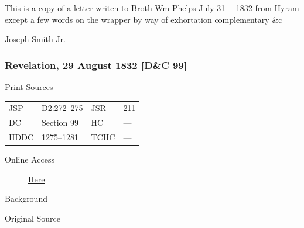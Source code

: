 				This is a copy of a letter writen to Broth Wm Phelps July 31--- 1832 from Hyram except a few words on the wrapper by way of exhortation complementary \&c

				\begin{tightright}
					Joseph Smith Jr.
				\end{tightright}
				
		\subsubsection{Revelation, 29 August 1832 [D\&C 99]}
			\label{EMS-1832-JS-29-AUG-1832}
		
			\begin{description}
				\item[Print Sources]
			\end{description}

				\begin{tabular}{p{0.5in}p{1in}p{0.5in}p{1in}}
				JSP	 	& D2:272--275	& JSR 		& 211 \\
				DC	 	& Section 99 	& HC 		& --- \\
				HDDC 	& 1275--1281	& TCHC 		& --- \\
				\end{tabular}
			
			\begin{description}
				\item[Online Access] \href{https://www.josephsmithpapers.org/paper-summary/revelation-29-august-1832-dc-99/1}{Here}
			\end{description}
			
			\begin{description}
				\item[Background]
			\end{description}
			
			
			\begin{description}
				\item[Original Source]
			\end{description}
			
